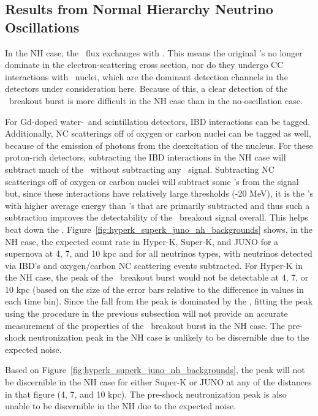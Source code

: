 \subsection{Results from Normal Hierarchy Neutrino Oscillations}
In the NH case, the \nue\ flux exchanges with \nuxpart.  This
means the original \nue's no longer dominate in the
electron-scattering cross section, nor do they undergo CC
interactions with \ nuclei, which are the dominant detection
channels in the detectors under consideration here.  Because of this,
a clear detection of the \nue\ breakout burst is more difficult
in the NH case than in the no-oscillation case.

For Gd-doped water-\cer\ and scintillation detectors, IBD interactions
can be tagged.  Additionally, NC scatterings off of oxygen or
carbon nuclei can be tagged as well, because of the emission of
photons from the deexcitation of the nucleus.  
For these proton-rich detectors, subtracting the 
IBD interactions in the NH case will subtract much of the \background\ without
subtracting any 
\nue\ signal.  Subtracting NC scatterings off of oxygen or carbon
nuclei will subtract some \nue's from the signal but, since these
interactions have relatively large thresholds (-20 MeV), it is
the \nux's with higher average energy than \nue's 
that are primarily subtracted and thus
such a subtraction improves the detectability of the \nue\ breakout signal
overall.  This helps beat down the \backgrounds.
Figure~\ref{fig:hyperk_superk_juno_nh_backgrounds}
shows, in the NH case, the expected count rate in Hyper-K, Super-K, and JUNO 
for a supernova at 4, 7, and
10 kpc and for all neutrinos types, with
neutrinos detected via IBD's and oxygen/carbon NC scattering events subtracted.
For Hyper-K in the NH case, the peak of the \nue\ breakout burst 
would not be detectable at 4, 7, or 10 kpc (based on the
size of the error bars relative to the difference in values in each
time bin).  Since 
the fall from the peak is dominated by the 
\backgrounds, fitting the
peak using the procedure in the previous subsection will not
provide an accurate measurement of the properties of the \nue\
breakout burst in the NH case.  The
pre-shock neutronization peak in the NH case is unlikely to be 
discernible due to the expected noise.  

Based on Figure~\ref{fig:hyperk_superk_juno_nh_backgrounds}, the peak
will not be discernible in the NH case for either Super-K or JUNO at
any of the distances in that figure (4, 7, and 10 kpc).  The
pre-shock neutronization peak is also unable to be discernible in the
NH due to the expected noise.

